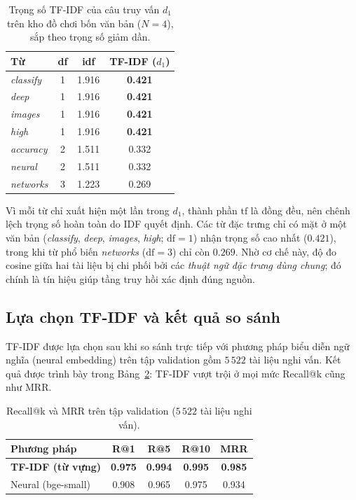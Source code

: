 \begin{table}[htbp]
\centering
\renewcommand{\arraystretch}{1.2}
\begin{tabular}{lccc}
\toprule
\textbf{Từ} & \textbf{df} & \textbf{idf} & \textbf{TF-IDF ($d_1$)} \\
\midrule
\emph{classify} & 1 & 1.916 & \textbf{0.421} \\
\emph{deep}     & 1 & 1.916 & \textbf{0.421} \\
\emph{images}   & 1 & 1.916 & \textbf{0.421} \\
\emph{high}     & 1 & 1.916 & \textbf{0.421} \\
\emph{accuracy} & 2 & 1.511 & 0.332 \\
\emph{neural}   & 2 & 1.511 & 0.332 \\
\emph{networks} & 3 & 1.223 & 0.269 \\
\bottomrule
\end{tabular}
\caption{Trọng số TF-IDF của câu truy vấn $d_1$ trên kho đồ chơi bốn văn bản ($N=4$),
sắp theo trọng số giảm dần.}
\label{tab:tfidf-demo}
\end{table}

Vì mỗi từ chỉ xuất hiện một lần trong $d_1$, thành phần $\mathrm{tf}$ là đồng đều, nên chênh
lệch trọng số hoàn toàn do IDF quyết định. Các từ đặc trưng chỉ có mặt ở một văn bản
(\emph{classify}, \emph{deep}, \emph{images}, \emph{high}; $\mathrm{df}=1$) nhận trọng số cao
nhất ($0.421$), trong khi từ phổ biến \emph{networks} ($\mathrm{df}=3$) chỉ còn $0.269$. Nhờ
cơ chế này, độ đo cosine giữa hai tài liệu bị chi phối bởi các \emph{thuật ngữ đặc trưng dùng
chung}; đó chính là tín hiệu giúp tầng truy hồi xác định đúng nguồn.

\subsection{Lựa chọn TF-IDF và kết quả so sánh}

TF-IDF được lựa chọn sau khi so sánh trực tiếp với phương pháp biểu diễn ngữ nghĩa (neural
embedding) trên tập validation gồm $5\,522$ tài liệu nghi vấn. Kết quả được trình bày trong
Bảng~\ref{tab:retrieval-recall}: TF-IDF vượt trội ở mọi mức Recall@k cũng như MRR.

\begin{table}[htbp]
\centering
\renewcommand{\arraystretch}{1.2}
\begin{tabular}{lcccc}
\toprule
\textbf{Phương pháp} & \textbf{R@1} & \textbf{R@5} & \textbf{R@10} & \textbf{MRR} \\
\midrule
\textbf{TF-IDF (từ vựng)}       & \textbf{0.975} & \textbf{0.994} & \textbf{0.995} & \textbf{0.985} \\
Neural (bge-small)              & 0.908          & 0.965          & 0.975          & 0.934          \\
\bottomrule
\end{tabular}
\caption{Recall@k và MRR trên tập validation ($5\,522$ tài liệu nghi vấn).}
\label{tab:retrieval-recall}
\end{table}

